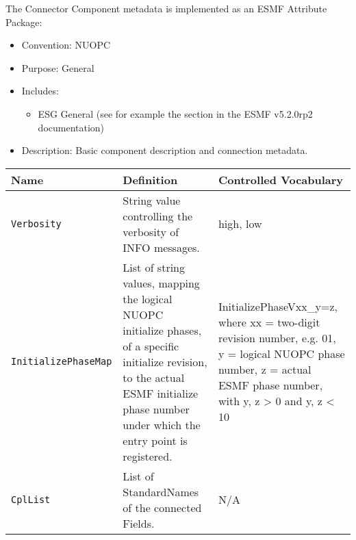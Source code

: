 The Connector Component metadata is implemented as an ESMF Attribute Package:

\begin{itemize}
    \item Convention: NUOPC
    \item Purpose: General
    \item Includes:
    \begin{itemize}
        \item ESG General (see for example the  section in the ESMF v5.2.0rp2 documentation)
    \end{itemize} 
    \item Description: Basic component description and connection metadata. 
\end{itemize}

\begin{tabular}{|p{5cm}|p{5cm}|p{35mm}|}
     \hline\hline
     {\bf Name} & {\bf Definition} & {\bf Controlled Vocabulary}\\
     \hline\hline
     {\tt Verbosity} & String value controlling the verbosity of INFO messages.& high, low\\
     {\tt InitializePhaseMap} & List of string values, mapping the logical NUOPC initialize phases, of a specific initialize revision, to the actual ESMF initialize phase number under which the entry point is registered.& InitializePhaseVxx\_y=z, where xx = two-digit revision number, e.g. 01, y = logical NUOPC phase number, z = actual ESMF phase number, with y, z > 0 and y, z < 10 \\
     {\tt CplList} & List of StandardNames of the connected Fields.& N/A\\
     \hline\hline
\end{tabular}
